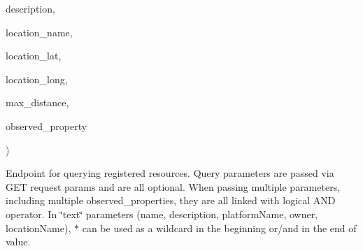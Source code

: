 {\begin{DoxyParamCaption}
\item[{@Request\+Param(value=\char`\"{}description\char`\"{}, required=false) String}]{description, }
\item[{@Request\+Param(value=\char`\"{}location\+\_\+name\char`\"{}, required=false) String}]{location\+\_\+name, }
\item[{@Request\+Param(value=\char`\"{}location\+\_\+lat\char`\"{}, required=false) Double}]{location\+\_\+lat, }
\item[{@Request\+Param(value=\char`\"{}location\+\_\+long\char`\"{}, required=false) Double}]{location\+\_\+long, }
\item[{@Request\+Param(value=\char`\"{}max\+\_\+distance\char`\"{}, required=false) Integer}]{max\+\_\+distance, }
\item[{@Request\+Param(value=\char`\"{}observed\+\_\+property\char`\"{}, required=false) String\mbox{[}$\,$\mbox{]}}]{observed\+\_\+property}
\end{DoxyParamCaption}
)}\hypertarget{classeu_1_1h2020_1_1symbiote_1_1controllers_1_1CoreInterfaceController_a77e06f47bb9cea92496704aae1b88b86}{}\label{classeu_1_1h2020_1_1symbiote_1_1controllers_1_1CoreInterfaceController_a77e06f47bb9cea92496704aae1b88b86}
Endpoint for querying registered resources. Query parameters are passed via G\+ET request params and are all optional. When passing multiple parameters, including multiple observed\+\_\+properties, they are all linked with logical A\+ND operator. In \char`\"{}text\char`\"{} parameters (name, description, platform\+Name, owner, location\+Name), $\ast$ can be used as a wildcard in the beginning or/and in the end of value.



